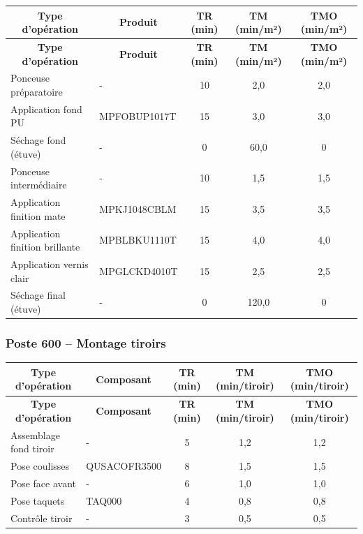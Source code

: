 \documentclass[12pt,a4paper]{article}
\begin{document}
\begin{longtable}{|p{5cm}|p{5cm}|c|c|c|}
\hline
\multicolumn{1}{|c|}{\textbf{Type d'opération}} & \multicolumn{1}{c|}{\textbf{Produit}} & \multicolumn{1}{c|}{\textbf{TR (min)}} & \multicolumn{1}{c|}{\textbf{TM (min/m²)}} & \multicolumn{1}{c|}{\textbf{TMO (min/m²)}} \\
\hline
\endfirsthead
\hline
\multicolumn{1}{|c|}{\textbf{Type d'opération}} & \multicolumn{1}{c|}{\textbf{Produit}} & \multicolumn{1}{c|}{\textbf{TR (min)}} & \multicolumn{1}{c|}{\textbf{TM (min/m²)}} & \multicolumn{1}{c|}{\textbf{TMO (min/m²)}} \\
\hline
\endhead
\hline
\endfoot
Ponceuse préparatoire & - & 10 & 2,0 & 2,0 \\
Application fond PU & MPFOBUP1017T & 15 & 3,0 & 3,0 \\
Séchage fond (étuve) & - & 0 & 60,0 & 0 \\
Ponceuse intermédiaire & - & 10 & 1,5 & 1,5 \\
Application finition mate & MPKJ1048CBLM & 15 & 3,5 & 3,5 \\
Application finition brillante & MPBLBKU1110T & 15 & 4,0 & 4,0 \\
Application vernis clair & MPGLCKD4010T & 15 & 2,5 & 2,5 \\
Séchage final (étuve) & - & 0 & 120,0 & 0 \\
\hline
\end{longtable}

\subsubsection{Poste 600 – Montage tiroirs}

\begin{longtable}{|p{5cm}|p{5cm}|c|c|c|}
\hline
\multicolumn{1}{|c|}{\textbf{Type d'opération}} & \multicolumn{1}{c|}{\textbf{Composant}} & \multicolumn{1}{c|}{\textbf{TR (min)}} & \multicolumn{1}{c|}{\textbf{TM (min/tiroir)}} & \multicolumn{1}{c|}{\textbf{TMO (min/tiroir)}} \\
\hline
\endfirsthead
\hline
\multicolumn{1}{|c|}{\textbf{Type d'opération}} & \multicolumn{1}{c|}{\textbf{Composant}} & \multicolumn{1}{c|}{\textbf{TR (min)}} & \multicolumn{1}{c|}{\textbf{TM (min/tiroir)}} & \multicolumn{1}{c|}{\textbf{TMO (min/tiroir)}} \\
\hline
\endhead
\hline
\endfoot
Assemblage fond tiroir & - & 5 & 1,2 & 1,2 \\
Pose coulisses & QUSACOFR3500 & 8 & 1,5 & 1,5 \\
Pose face avant & - & 6 & 1,0 & 1,0 \\
Pose taquets & TAQ000 & 4 & 0,8 & 0,8 \\
Contrôle tiroir & - & 3 & 0,5 & 0,5 \\
\hline
\end{longtable}
\end{document}
